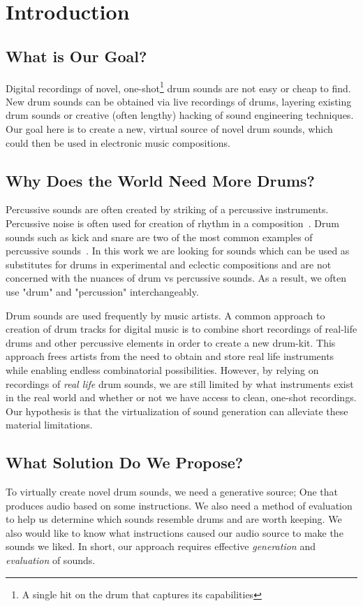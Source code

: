 \documentclass[\main/thesis.tex]{subfiles}
\begin{document}
\chapter{Introduction}

 
\section{What is Our Goal?}
Digital recordings of novel, one-shot\footnote{A single hit on the drum that captures its capabilities} drum sounds are not easy or cheap to find. New drum sounds can be obtained via live recordings of drums, layering existing drum sounds or creative (often lengthy) hacking of sound engineering techniques. Our goal here is to create a new, virtual source of novel drum sounds, which could then be used in electronic music compositions.

\section{Why Does the World Need More Drums?}
 Percussive sounds are often created by striking of a percussive instruments. Percussive noise is often used for creation of rhythm in a composition~\cite{needham1967percussion}. Drum sounds such as kick and snare are two of the most common examples of percussive sounds~\cite{barry2005drum}. In this work we are looking for sounds which can be used as substitutes for drums in experimental and eclectic compositions and are not concerned with the nuances of drum vs percussive sounds. As a result, we often use "drum" and "percussion" interchangeably.

 Drum sounds are used frequently by music artists. A common approach to creation of drum tracks for digital music is to combine short recordings of real-life drums and other percussive elements in order to create a new drum-kit. This approach frees artists from the need to obtain and store real life instruments while enabling endless combinatorial possibilities. However, by relying on recordings of \textit{real life} drum sounds, we are still limited by what instruments exist in the real world and whether or not we have access to clean, one-shot recordings. Our hypothesis is that the virtualization of sound generation can alleviate these material limitations. 
 
\section{What Solution Do We Propose?}
To virtually create novel drum sounds, we need a generative source; One that produces audio based on some instructions. We also need a method of evaluation to help us determine which sounds resemble drums and are worth keeping. We also would like to know what instructions caused our audio source to make the sounds we liked. In short, our approach requires effective \textit{generation} and \textit{evaluation} of sounds. 
\end{document}
